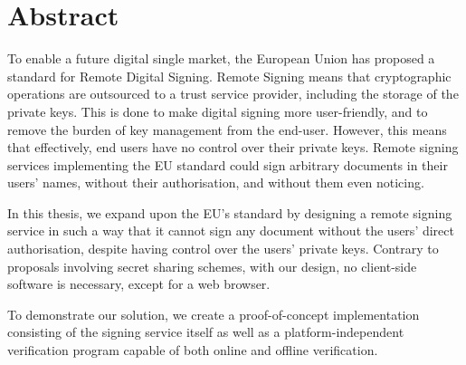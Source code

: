 \chapter*{Abstract}\label{ch:abstract}
To enable a future digital single market,
the European Union has proposed a standard for Remote Digital Signing.
Remote Signing means that cryptographic operations are outsourced to a trust service provider,
including the storage of the private keys.
This is done to make digital signing more user-friendly,
and to remove the burden of key management from the end-user.
However, this means that effectively, end users have no control over their private keys.
Remote signing services implementing the EU standard could sign arbitrary documents in their users' names,
without their authorisation, and without them even noticing.

In this thesis,
we expand upon the EU's standard by designing a remote signing service in such a way that it cannot sign any document without the users' direct authorisation,
despite having control over the users' private keys.
Contrary to proposals involving secret sharing schemes,
with our design, no client-side software is necessary, except for a web browser.

To demonstrate our solution,
we create a proof-of-concept implementation consisting of the signing service itself as well as a
 platform-independent verification program capable of both online and offline verification.




